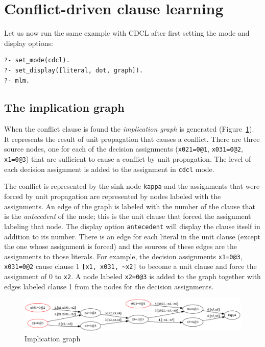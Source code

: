 \documentclass[11pt]{report}
\newcommand*{\p}[1]{\textup{\texttt{#1}}}
\begin{document}
\section{Conflict-driven clause learning}

Let us now run the same example with CDCL after first setting the mode
and display options:

\begin{verbatim}
?- set_mode(cdcl).
?- set_display([literal, dot, graph]).
?- mlm.
\end{verbatim}

\subsection{The implication graph}

When the conflict clause is found the \emph{implication graph} is
generated (Figure~\ref{fig.graph}). It represents the result of unit
propagation that causes a conflict. There are three source nodes, one
for each of the decision assignments (\p{x021=0@1}, \p{x031=0@2},
\p{x1=0@3}) that are sufficient to cause a conflict by unit propagation.
The level of each decision assignment is added to the assignment in
\p{cdcl} mode.

The conflict is represented by the sink node \p{kappa} and the
assignments that were forced by unit propagation are represented by
nodes labeled with the assignments. An edge of the graph is labeled with
the number of the clause that is the \emph{antecedent} of the node; this
is the unit clause that forced the assignment labeling that
node. The display option \p{antecedent} will display the clause
itself in addition to its number. There is an edge for each literal in
the unit clause (except the one whose assignment is forced) and the
sources of these edges are the assignments to those literals. For
example, the decision assignments \p{x1=0@3}, \p{x031=0@2}
cause clause 1 \verb+[x1, x031, ~x2]+ to become a unit clause
and force the assignment of 0 to \p{x2}. A node labeled \p{x2=0@3} is
added to the graph together with edges labeled clause 1 from the
nodes for the decision assignments.

\begin{figure}
\begin{center}
\includegraphics[keepaspectratio=true,width=\textwidth]{graph}
\end{center}
\caption{Implication graph}\label{fig.graph}
\end{figure}
\end{document}
